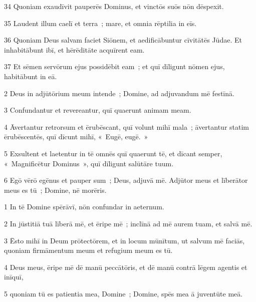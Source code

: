 \psalmVerse
  {\phantom{0}34}
  {Quoniam exaudīvit pauperēs Dominus, et vinctōs suōs nōn dēspexit.}


\psalmVerse
  {\phantom{0}35}
  {Laudent illum caelī et terra~; mare, et omnia rēptilia in eīs.}


\psalmVerse
  {\phantom{0}36}
  {Quoniam Deus salvam faciet Siōnem, et aedificābuntur cīvitātēs Jūdae. Et inhabitābunt ibī, et hērēditāte acquīrent eam.}


\psalmVerse
  {\phantom{0}37}
  {Et sēmen servōrum ejus possidēbit eam~; et quī dīligunt nōmen ejus, habitābunt in eā.}



\psalmVerse
  {\phantom{00}2}
  {Deus in adjūtōrium meum intende~; Domine, ad adjuvandum mē festīnā.}


\psalmVerse
  {\phantom{00}3}
  {Confundantur et revereantur, quī quaerunt animam meam.}


\psalmVerse
  {\phantom{00}4}
  {Āvertantur retrorsum et ērubēscant, quī volunt mihī mala~; āvertantur statim ērubēscentēs, quī dīcunt mihī, «~Eugē, eugē.~»}


\psalmVerse
  {\phantom{00}5}
  {Exsultent et laetentur in tē omnēs quī quaerunt tē, et dīcant semper, «~Magnificētur Dominus~», quī dīligunt salūtāre tuum.}


\psalmVerse
  {\phantom{00}6}
  {Egō vērō egēnus et pauper sum~; Deus, adjuvā mē. Adjūtor meus et līberātor meus es tū~; Domine, nē morēris.}




\psalmVerse
  {\phantom{00}1}
  {In tē Domine spērāvī, nōn confundar in aeternum.}


\psalmVerse
  {\phantom{00}2}
  {In jūstitiā tuā līberā mē, et ēripe mē~; inclīnā ad mē aurem tuam, et salvā mē.}


\psalmVerse
  {\phantom{00}3}
  {Ēsto mihī in Deum prōtectōrem, et in locum mūnītum, ut salvum mē faciās, quoniam firmāmentum meum et refugium meum es tū.}


\psalmVerse
  {\phantom{00}4}
  {Deus meus, ēripe mē dē manū peccātōris, et dē manū contrā lēgem agentis et inīquī,}


\psalmVerse
  {\phantom{00}5}
  {quoniam tū es patientia mea, Domine~; Domine, spēs mea ā juventūte meā.}


